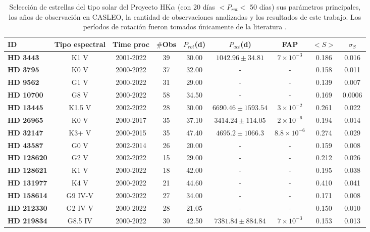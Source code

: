 \documentclass[baaa]{baaa}
\begin{document}
\begin{table*}[hbt!]
    \centering
    \begin{tabular}{lcccccccc}
    \hline\hline\noalign{\smallskip}
     \!\!\textbf{ID} &\textbf{Tipo espectral}&\textbf{Time proc} &\textbf{$\#$Obs} &\textbf{$P_{rot}$(d)} &\textbf{$P_{act}$(d)}& FAP & $<S>$ & $\sigma_S$\\
     \hline\noalign{\smallskip}
     \!\!\textbf{HD 3443}   &   K1 V  & 2001-2022 & 39 & 30.00 & $1042.96 \pm 34.81$ & $7 \times 10^{-3}$ & 0.186 & 0.016\\ 
     \!\!\textbf{HD 3795}   &   K0 V  & 2000-2022 & 37 & 32.00 & - & - & 0.158 & 0.011 \\ 
     \!\!\textbf{HD 9562}   &   G1 V  & 2000-2022 & 31 & 29.00 & - & - & 0.139 & 0.007 \\ 
     \!\!\textbf{HD 10700}  &   G8 V  & 2000-2022 & 58 & 34.50 & - & - & 0.169 & 0.0006\\ 
     \!\!\textbf{HD 13445}  &  K1.5 V & 2002-2022 & 28 & 30.00 & $6690.46 \pm 1593.54$ & $3 \times 10^{-2}$ & 0.261 & 0.022 \\ 
     \!\!\textbf{HD 26965}  &   K0 V  & 2000-2017 & 35 & 37.10 & $3414.24 \pm 114.05$ & $2 \times 10^{-6}$ & 0.194 & 0.014 \\ 
     \!\!\textbf{HD 32147}  &  K3+ V  & 2000-2015 & 35 & 47.40 & $4695.2 \pm 1066.3$ & $8.8 \times 10^{-6}$ & 0.274 & 0.029 \\ 
     \!\!\textbf{HD 43587}  &   G0 V  & 2002-2014 & 26 & 20.00 & - & - & 0.159 & 0.008 \\ 
     \!\!\textbf{HD 128620} &   G2 V  & 2002-2022 & 15 & 29.00 & - & - & 0.212 & 0.026 \\ 
     \!\!\textbf{HD 128621} &   K1 V  & 2000-2022 & 18 & 42.00 & - & - & 0.195 & 0.038 \\ 
     \!\!\textbf{HD 131977} &   K4 V  & 2000-2022 & 21 & 44.60 & - & - & 0.410 & 0.041 \\ 
     \!\!\textbf{HD 158614} & G9 IV-V & 2000-2022 & 27 & 34.00 & - & - & 0.171 & 0.008 \\ 
     \!\!\textbf{HD 212330} & G2 IV-V & 2000-2022 & 28 & 21.05 & - & - & 0.150 & 0.010\\ 
     \!\!\textbf{HD 219834} & G8.5 IV & 2000-2022 & 30 & 42.50 & $7381.84 \pm 884.84$ & $7 \times 10^{-3}$ & 0.153 & 0.013  \\ \hline
    \end{tabular}
    \caption{Selección de estrellas del tipo solar del Proyecto HK$\alpha$ (con 20 días  $<P_{rot}<$ 50 días) sus parámetros principales, los años de observación en CASLEO, la cantidad de observaciones analizadas y los resultados de este trabajo. Los períodos de rotación fueron tomados únicamente de la literatura \citep{Cincunegui07}.}
    \label{resumen}
\end{table*}
\end{document}
